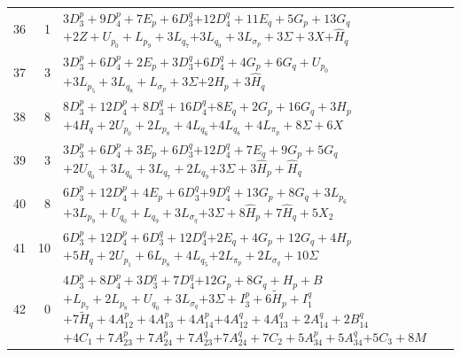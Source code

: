 \documentclass[11pt,a4paper]{article}
\theoremstyle{remark}
\begin{document}
\begin{longtable}{rrp{12.7cm}}
36&1&\( 3D_3^p + 9D_4^p + 7E_p + 6D_3^q \)\newline\( + 12D_4^q + 11E_q + 5G_p + 13G_q \)\newline\( + 2Z + U_{p_{0}} + L_{p_{9}} + 3L_{q_{7}} \)\newline\( + 3L_{q_{9}} + 3L_{\sigma_p} + 3\Sigma + 3X \)\newline\( + \widehat H_q \)\\[3pt]
37&3&\( 3D_3^p + 6D_4^p + 2E_p + 3D_3^q \)\newline\( + 6D_4^q + 4G_p + 6G_q + U_{p_{0}} \)\newline\( + 3L_{p_{5}} + 3L_{q_{8}} + L_{\sigma_p} + 3\Sigma \)\newline\( + 2\widehat H_p + 3\widehat H_q \)\\[3pt]
38&8&\( 8D_3^p + 12D_4^p + 8D_3^q + 16D_4^q \)\newline\( + 8E_q + 2G_p + 16G_q + 3H_p \)\newline\( + 4H_q + 2U_{p_{0}} + 2L_{p_{8}} + 4L_{q_{6}} \)\newline\( + 4L_{q_{8}} + 4L_{\pi_p} + 8\Sigma + 6X \)\\[3pt]
39&3&\( 3D_3^p + 6D_4^p + 3E_p + 6D_3^q \)\newline\( + 12D_4^q + 7E_q + 9G_p + 5G_q \)\newline\( + 2U_{q_{0}} + 3L_{q_{6}} + 3L_{q_{7}} + 2L_{q_{9}} \)\newline\( + 3\Sigma + 3\widehat H_p + \widehat H_q \)\\[3pt]
40&8&\( 6D_3^p + 12D_4^p + 4E_p + 6D_3^q \)\newline\( + 9D_4^q + 13G_p + 8G_q + 3L_{p_{6}} \)\newline\( + 3L_{p_{9}} + U_{q_{0}} + L_{q_{9}} + 3L_{\sigma_q} \)\newline\( + 3\Sigma + 8\widehat H_p + 7\widehat H_q + 5X_2 \)\\[3pt]
41&10&\( 6D_3^p + 12D_4^p + 6D_3^q + 12D_4^q \)\newline\( + 2E_q + 4G_p + 12G_q + 4H_p \)\newline\( + 5H_q + 2U_{p_{1}} + 6L_{p_{8}} + 4L_{q_{5}} \)\newline\( + 2L_{\pi_p} + 2L_{\sigma_q} + 10\Sigma \)\\[3pt]
42&0&\( 4D_3^p + 8D_4^p + 3D_3^q + 7D_4^q \)\newline\( + 12G_p + 8G_q + H_p + B \)\newline\( + L_{p_{7}} + 2L_{p_{8}} + U_{q_{0}} + 3L_{\sigma_q} \)\newline\( + 3\Sigma + I_3^p + 6\widetilde H_p + I_1^q \)\newline\( + 7\widetilde H_q + 4A_{12}^p + 4A_{13}^p + 4A_{14}^p \)\newline\( + 4A_{12}^q + 4A_{13}^q + 2A_{14}^q + 2B_{14}^q \)\newline\( + 4C_1 + 7A_{23}^p + 7A_{24}^p + 7A_{23}^q \)\newline\( + 7A_{24}^q + 7C_2 + 5A_{34}^p + 5A_{34}^q \)\newline\( + 5C_3 + 8M \)\\[3pt]

\end{longtable}
\end{document}
